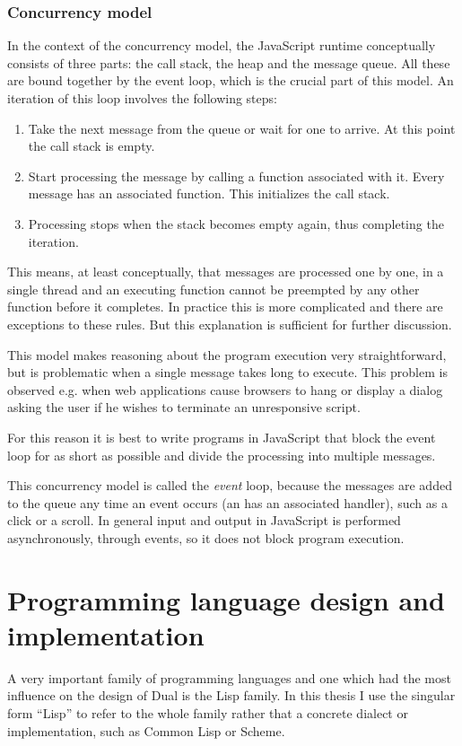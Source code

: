 \subsubsection{Concurrency model}
In the context of the concurrency model, the JavaScript runtime conceptually
consists of three parts: the call stack, the heap and the message queue. All
these are bound together by the event loop\cite{mdn_concurrency}, which is the crucial part of this model.  An iteration of this loop involves the following steps:
\begin{enumerate}
	\item Take the next message from the queue or wait for one to arrive. At
          this point the call stack is empty.
	\item Start processing the message by calling a function associated with
          it. Every message has an associated function. This initializes the
          call stack.
	\item Processing stops when the stack becomes empty again, thus
          completing the iteration.
\end{enumerate}

This means, at least conceptually, that messages are processed one by one, in a single thread and an executing function cannot be preempted by any other function before it completes. In practice this is more complicated and there are exceptions to these rules. But this explanation is sufficient for further discussion.

This model makes reasoning about the program execution very straightforward, but
is problematic when a single message takes long to execute. This problem is
observed e.g. when web applications cause browsers to hang or display a
dialog asking the user if he wishes to terminate an unresponsive script.

For this reason it is best to write programs in JavaScript that block the event
loop for as short as possible and divide the processing into multiple messages.

This concurrency model is called the \textit{event} loop, because the messages are added to the queue any time an event occurs (an has an associated handler), such as a click or a scroll. In general input and output in JavaScript is performed asynchronously, through events, so it does not block program execution.

\section{Programming language design and implementation}
A very important family of programming languages and one which had the most
influence on the design of Dual is the Lisp family. In this thesis I use the
singular form ``Lisp'' to refer to the whole family rather that a concrete
dialect or implementation, such as Common Lisp or Scheme.

